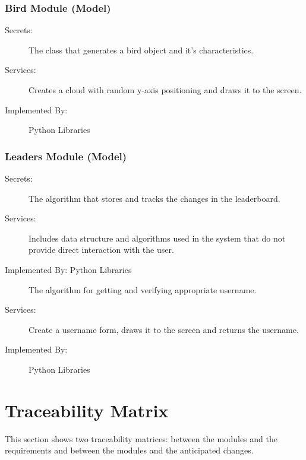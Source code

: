 \documentclass[12pt, titlepage]{article}
\begin{document}
\subsubsection{Bird Module (Model)}
\begin{description}
\item[Secrets:] The class that generates a bird object and it's characteristics. 
\item[Services:] Creates a cloud with random y-axis positioning and draws it to the screen. 
\item[Implemented By:] Python Libraries
\end{description}



\subsubsection{Leaders Module (Model)}
\begin{description}
\item[Secrets:] The algorithm that stores and tracks the changes in the leaderboard.
\item[Services:] Includes data structure and algorithms used in the system that do not provide direct interaction with the user. 
\item[Implemented By: Python Libraries
\end{description}


\subsubsection{Username Module (Model)}
\begin{description}
\color{blue}
\item[Secrets:]The algorithm for getting and verifying appropriate username.
\item[Services:]Create a username form, draws it to the screen and returns the username.
\item[Implemented By:] Python Libraries
\end{description}



\section{Traceability Matrix} \label{SecTM}

This section shows two traceability matrices: between the modules and the
requirements and between the modules and the anticipated changes.
\end{document}
